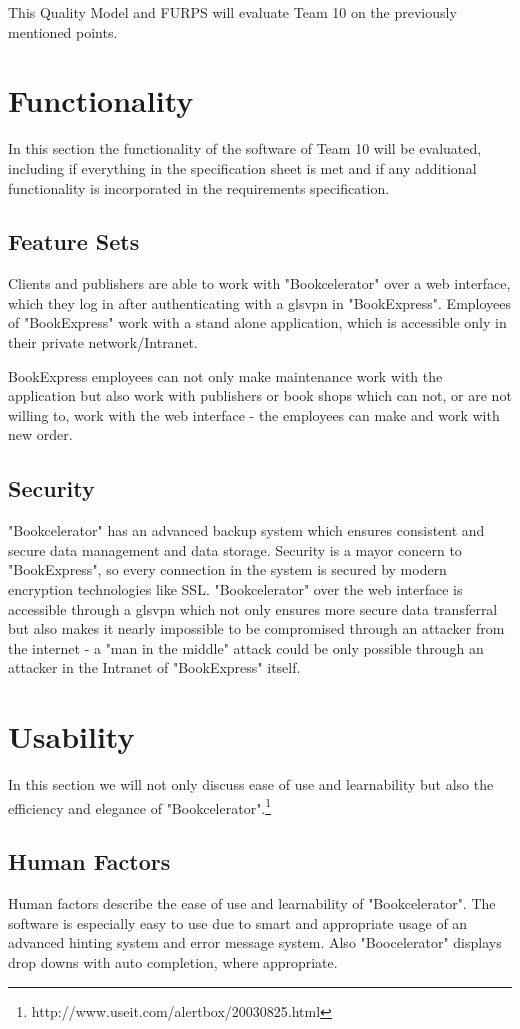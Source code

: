 \documentclass[11pt,a4paper,oneside,svgnames]{report}
\begin{document}
This Quality Model and FURPS will evaluate Team 10 on the previously mentioned points.

\section{Functionality}
In this section the functionality of the software of Team 10 will be evaluated, including if everything in the specification sheet is met and if any additional functionality is incorporated in the requirements specification.

\subsection{Feature Sets}
Clients and publishers are able to work with "Bookcelerator" over a web interface, which they log in after authenticating with a gls{vpn} in "BookExpress". Employees of "BookExpress" work with a stand alone application, which is accessible only in their private network/Intranet.

BookExpress employees can not only make maintenance work with the application but also work with publishers or book shops which can not, or are not willing to, work with the web interface - the employees can make and work with new order.

\subsection{Security}
"Bookcelerator" has an advanced backup system which ensures consistent and secure data management and data storage. Security is a mayor concern to "BookExpress", so every connection in the system is secured by modern encryption technologies like SSL. "Bookcelerator" over the web interface is accessible through a gls{vpn} which not only ensures more secure data transferral but also makes it nearly impossible to be compromised through an attacker from the internet - a "man in the middle" attack could be only possible through an attacker in the Intranet of "BookExpress" itself.

\section{Usability}
In this section we will not only discuss ease of use and learnability but also the efficiency and elegance of "Bookcelerator".\footnote{http://www.useit.com/alertbox/20030825.html}

\subsection{Human Factors}
Human factors describe the ease of use and learnability of "Bookcelerator". The software is especially easy to use due to smart and appropriate usage of an advanced hinting system and error message system. Also "Boocelerator" displays drop downs with auto completion, where appropriate.
\end{document}
